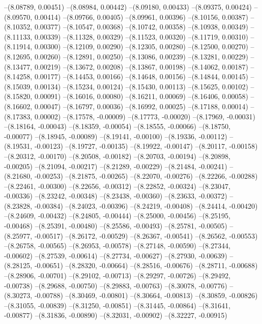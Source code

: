 --(8.08789, 0.00451)
--(8.08984, 0.00442)
--(8.09180, 0.00433)
--(8.09375, 0.00424)
--(8.09570, 0.00414)
--(8.09766, 0.00405)
--(8.09961, 0.00396)
--(8.10156, 0.00387)
--(8.10352, 0.00377)
--(8.10547, 0.00368)
--(8.10742, 0.00358)
--(8.10938, 0.00349)
--(8.11133, 0.00339)
--(8.11328, 0.00329)
--(8.11523, 0.00320)
--(8.11719, 0.00310)
--(8.11914, 0.00300)
--(8.12109, 0.00290)
--(8.12305, 0.00280)
--(8.12500, 0.00270)
--(8.12695, 0.00260)
--(8.12891, 0.00250)
--(8.13086, 0.00239)
--(8.13281, 0.00229)
--(8.13477, 0.00219)
--(8.13672, 0.00208)
--(8.13867, 0.00198)
--(8.14062, 0.00187)
--(8.14258, 0.00177)
--(8.14453, 0.00166)
--(8.14648, 0.00156)
--(8.14844, 0.00145)
--(8.15039, 0.00134)
--(8.15234, 0.00124)
--(8.15430, 0.00113)
--(8.15625, 0.00102)
--(8.15820, 0.00091)
--(8.16016, 0.00080)
--(8.16211, 0.00069)
--(8.16406, 0.00058)
--(8.16602, 0.00047)
--(8.16797, 0.00036)
--(8.16992, 0.00025)
--(8.17188, 0.00014)
--(8.17383, 0.00002)
--(8.17578, -0.00009)
--(8.17773, -0.00020)
--(8.17969, -0.00031)
--(8.18164, -0.00043)
--(8.18359, -0.00054)
--(8.18555, -0.00066)
--(8.18750, -0.00077)
--(8.18945, -0.00089)
--(8.19141, -0.00100)
--(8.19336, -0.00112)
--(8.19531, -0.00123)
--(8.19727, -0.00135)
--(8.19922, -0.00147)
--(8.20117, -0.00158)
--(8.20312, -0.00170)
--(8.20508, -0.00182)
--(8.20703, -0.00194)
--(8.20898, -0.00205)
--(8.21094, -0.00217)
--(8.21289, -0.00229)
--(8.21484, -0.00241)
--(8.21680, -0.00253)
--(8.21875, -0.00265)
--(8.22070, -0.00276)
--(8.22266, -0.00288)
--(8.22461, -0.00300)
--(8.22656, -0.00312)
--(8.22852, -0.00324)
--(8.23047, -0.00336)
--(8.23242, -0.00348)
--(8.23438, -0.00360)
--(8.23633, -0.00372)
--(8.23828, -0.00384)
--(8.24023, -0.00396)
--(8.24219, -0.00408)
--(8.24414, -0.00420)
--(8.24609, -0.00432)
--(8.24805, -0.00444)
--(8.25000, -0.00456)
--(8.25195, -0.00468)
--(8.25391, -0.00480)
--(8.25586, -0.00493)
--(8.25781, -0.00505)
--(8.25977, -0.00517)
--(8.26172, -0.00529)
--(8.26367, -0.00541)
--(8.26562, -0.00553)
--(8.26758, -0.00565)
--(8.26953, -0.00578)
--(8.27148, -0.00590)
--(8.27344, -0.00602)
--(8.27539, -0.00614)
--(8.27734, -0.00627)
--(8.27930, -0.00639)
--(8.28125, -0.00651)
--(8.28320, -0.00664)
--(8.28516, -0.00676)
--(8.28711, -0.00688)
--(8.28906, -0.00701)
--(8.29102, -0.00713)
--(8.29297, -0.00726)
--(8.29492, -0.00738)
--(8.29688, -0.00750)
--(8.29883, -0.00763)
--(8.30078, -0.00776)
--(8.30273, -0.00788)
--(8.30469, -0.00801)
--(8.30664, -0.00813)
--(8.30859, -0.00826)
--(8.31055, -0.00839)
--(8.31250, -0.00851)
--(8.31445, -0.00864)
--(8.31641, -0.00877)
--(8.31836, -0.00890)
--(8.32031, -0.00902)
--(8.32227, -0.00915)
